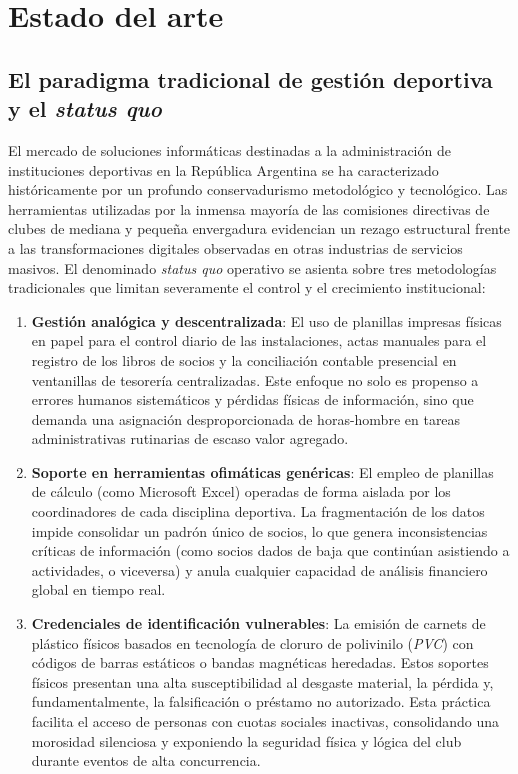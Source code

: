 \section{Estado del arte}

\subsection{El paradigma tradicional de gestión deportiva y el \textit{status quo}}

El mercado de soluciones informáticas destinadas a la administración de instituciones deportivas en la República Argentina se ha caracterizado históricamente por un profundo conservadurismo metodológico y tecnológico. Las herramientas utilizadas por la inmensa mayoría de las comisiones directivas de clubes de mediana y pequeña envergadura evidencian un rezago estructural frente a las transformaciones digitales observadas en otras industrias de servicios masivos. El denominado \textit{status quo} operativo se asienta sobre tres metodologías tradicionales que limitan severamente el control y el crecimiento institucional:

\begin{enumerate}
    \item \textbf{Gestión analógica y descentralizada}: El uso de planillas impresas físicas en papel para el control diario de las instalaciones, actas manuales para el registro de los libros de socios y la conciliación contable presencial en ventanillas de tesorería centralizadas. Este enfoque no solo es propenso a errores humanos sistemáticos y pérdidas físicas de información, sino que demanda una asignación desproporcionada de horas-hombre en tareas administrativas rutinarias de escaso valor agregado.
    \item \textbf{Soporte en herramientas ofimáticas genéricas}: El empleo de planillas de cálculo (como Microsoft Excel) operadas de forma aislada por los coordinadores de cada disciplina deportiva. La fragmentación de los datos impide consolidar un padrón único de socios, lo que genera inconsistencias críticas de información (como socios dados de baja que continúan asistiendo a actividades, o viceversa) y anula cualquier capacidad de análisis financiero global en tiempo real.
    \item \textbf{Credenciales de identificación vulnerables}: La emisión de carnets de plástico físicos basados en tecnología de cloruro de polivinilo (\textit{PVC}) con códigos de barras estáticos o bandas magnéticas heredadas. Estos soportes físicos presentan una alta susceptibilidad al desgaste material, la pérdida y, fundamentalmente, la falsificación o préstamo no autorizado. Esta práctica facilita el acceso de personas con cuotas sociales inactivas, consolidando una morosidad silenciosa y exponiendo la seguridad física y lógica del club durante eventos de alta concurrencia.
\end{enumerate}

